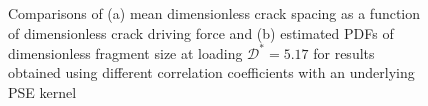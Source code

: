 \begin{figure}[htb!]
\begin{subfigure}[b]{0.475\textwidth}
    \caption{}
  \end{subfigure}
  \caption[Fragment statistics for different correlation coefficients with a PSE kernel.]{Comparisons of (a) mean dimensionless crack spacing as a function of dimensionless crack driving force and (b) estimated PDFs of dimensionless fragment size at loading $\mathcal{D}^* = 5.17$ for results obtained using different correlation coefficients with an underlying PSE kernel}
  \label{fig: Chapter4/2D/statistics_sensitivity_sqexp}
\end{figure}

